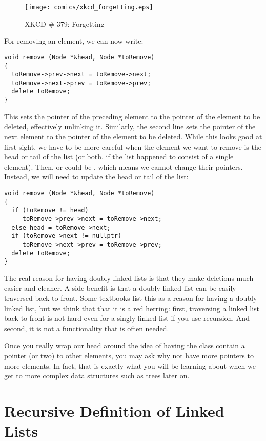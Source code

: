 \begin{description}
\begin{figure}[htb]
\centering
\texttt{[image: comics/xkcd\_forgetting.eps]}
\caption{XKCD \# 379: Forgetting}
\end{figure}

For removing an element, we can now write:
\begin{verbatim}
void remove (Node *&head, Node *toRemove)
{
  toRemove->prev->next = toRemove->next;
  toRemove->next->prev = toRemove->prev;
  delete toRemove;
}
\end{verbatim}
This sets the  pointer of the preceding element to the
 pointer of the element to be deleted, effectively
unlinking it. 
Similarly, the second line sets the  pointer of the next
element to the  pointer of the element to be deleted. 
While this looks good at first sight,
we have to be more careful when the element we want to remove is the
head or tail of the list
(or both, if the list happened to consist of a single element).
Then,  or  could be ,
which means we cannot change their pointers.
Instead, we will need to update the head or tail of the list:

\begin{verbatim}
void remove (Node *&head, Node *toRemove)
{
  if (toRemove != head) 
     toRemove->prev->next = toRemove->next;
  else head = toRemove->next;
  if (toRemove->next != nullptr) 
     toRemove->next->prev = toRemove->prev;
  delete toRemove;
}
\end{verbatim}
\end{description}

The real reason for having doubly linked lists is that they
make deletions much easier and cleaner.
A side benefit is that a doubly linked list can be easily traversed
back to front.
Some textbooks list this as a reason for having a doubly linked list,
but we think that that it is a red herring:
first, traversing a linked list back to front is not hard even for a
singly-linked list if you use recursion.
And second, it is not a functionality that is often needed.

Once you really wrap our head around the idea of having the
 class contain a pointer (or two) to other  elements,
you may ask why not have more pointers to more  elements. 
In fact, that is exactly what you will be learning about when we get
to more complex data structures such as trees later on.

\section{Recursive Definition of Linked Lists}

